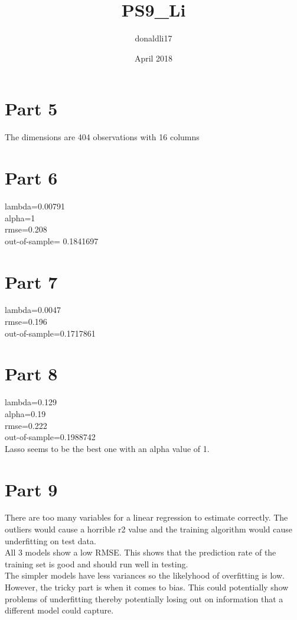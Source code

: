 \documentclass{article}
\title{PS9_Li}
\author{donaldli17 }
\date{April 2018}
\begin{document}
\maketitle

\section{Part 5}
The dimensions are 404 observations with 16 columns

\section{Part 6}
lambda=0.00791\\
alpha=1\\
rmse=0.208\\
out-of-sample= 0.1841697
\section{Part 7}
lambda=0.0047\\
rmse=0.196\\
out-of-sample=0.1717861
\section{Part 8}
lambda=0.129\\
alpha=0.19 \\
rmse=0.222\\
out-of-sample=0.1988742\\

Lasso seems to be the best one with an alpha value of 1.

\section{Part 9}
There are too many variables for a linear regression to estimate correctly. The outliers would cause a horrible r2 value and the training algorithm would cause underfitting on test data. 
\\
All 3 models show a low RMSE. This shows that the prediction rate of the training set is good and should run well in testing. \\

The simpler models have less variances so the likelyhood of overfitting is low. However, the tricky part is when it comes to bias. This could potentially show problems of underfitting thereby potentially losing out on information that a different model could capture. 
\end{document}
